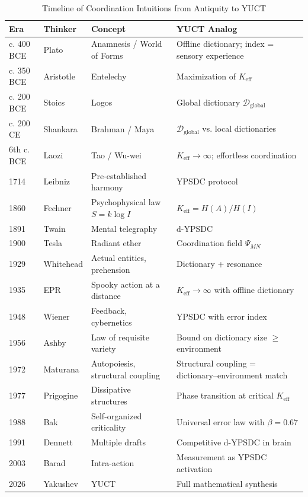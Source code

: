 \documentclass[12pt,a4paper]{article}
\begin{document}
	\begin{table}[htbp]
		\centering
		\caption{Timeline of Coordination Intuitions from Antiquity to YUCT}
		\label{tab:timeline}
		\small
		\begin{tabular}{p{1.2cm}p{3cm}p{4.5cm}p{4cm}}
			\toprule
			\textbf{Era} & \textbf{Thinker} & \textbf{Concept} & \textbf{YUCT Analog} \\
			\midrule
			c. 400 BCE & Plato & Anamnesis / World of Forms & Offline dictionary; index = sensory experience \\
			c. 350 BCE & Aristotle & Entelechy & Maximization of \(K_{\mathrm{eff}}\) \\
			c. 200 BCE & Stoics & Logos & Global dictionary \(\mathcal{D}_{\text{global}}\) \\
			c. 200 CE & Shankara & Brahman / Maya & \(\mathcal{D}_{\text{global}}\) vs. local dictionaries \\
			6th c. BCE & Laozi & Tao / Wu-wei & \(K_{\mathrm{eff}} \to \infty\); effortless coordination \\
			1714 & Leibniz & Pre-established harmony & YPSDC protocol \\
			1860 & Fechner & Psychophysical law \(S = k \log I\) & \(K_{\mathrm{eff}} = H(A)/H(I)\) \\
			1891 & Twain & Mental telegraphy & d-YPSDC \\
			1900 & Tesla & Radiant ether & Coordination field \(\Psi_{MN}\) \\
			1929 & Whitehead & Actual entities, prehension & Dictionary + resonance \\
			1935 & EPR & Spooky action at a distance & \(K_{\mathrm{eff}} \to \infty\) with offline dictionary \\
			1948 & Wiener & Feedback, cybernetics & YPSDC with error index \\
			1956 & Ashby & Law of requisite variety & Bound on dictionary size \(\ge\) environment \\
			1972 & Maturana & Autopoiesis, structural coupling & Structural coupling = dictionary–environment match \\
			1977 & Prigogine & Dissipative structures & Phase transition at critical \(K_{\mathrm{eff}}\) \\
			1988 & Bak & Self-organized criticality & Universal error law with \(\beta = 0.67\) \\
			1991 & Dennett & Multiple drafts & Competitive d-YPSDC in brain \\
			2003 & Barad & Intra-action & Measurement as YPSDC activation \\
			2026 & Yakushev & YUCT & Full mathematical synthesis \\
			\bottomrule
		\end{tabular}
	\end{table}
	
\end{document}
